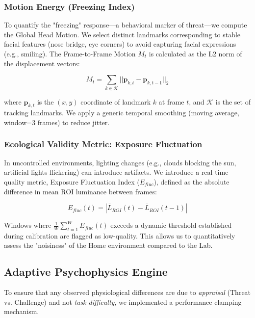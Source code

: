 \documentclass[journal]{IEEEtran}
\begin{document}
\subsubsection{Motion Energy (Freezing Index)}
To quantify the "freezing" response—a behavioral marker of threat—we compute the Global Head Motion. We select distinct landmarks corresponding to stable facial features (nose bridge, eye corners) to avoid capturing facial expressions (e.g., smiling). The Frame-to-Frame Motion $M_t$ is calculated as the L2 norm of the displacement vectors:

\begin{equation}
M_t = \sum_{k \in \mathcal{K}} || \mathbf{p}_{k,t} - \mathbf{p}_{k,t-1} ||_2
\end{equation}

where $\mathbf{p}_{k,t}$ is the $(x,y)$ coordinate of landmark $k$ at frame $t$, and $\mathcal{K}$ is the set of tracking landmarks. We apply a generic temporal smoothing (moving average, window=3 frames) to reduce jitter.

\subsubsection{Ecological Validity Metric: Exposure Fluctuation}
In uncontrolled environments, lighting changes (e.g., clouds blocking the sun, artificial lights flickering) can introduce artifacts. We introduce a real-time quality metric, Exposure Fluctuation Index ($E_{fluc}$), defined as the absolute difference in mean ROI luminance between frames:

\begin{equation}
E_{fluc}(t) = | \bar{L}_{ROI}(t) - \bar{L}_{ROI}(t-1) |
\end{equation}

Windows where $\frac{1}{W}\sum_{t=1}^W E_{fluc}(t)$ exceeds a dynamic threshold established during calibration are flagged as low-quality. This allows us to quantitatively assess the "noisiness" of the Home environment compared to the Lab.

\subsection{Adaptive Psychophysics Engine}

To ensure that any observed physiological differences are due to \textit{appraisal} (Threat vs. Challenge) and not \textit{task difficulty}, we implemented a performance clamping mechanism.
\end{document}
